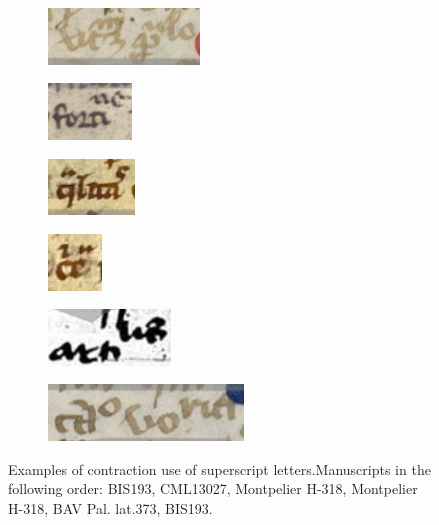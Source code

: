 \documentclass{article}
\begin{document}
\begin{figure}[H]
    \centering
    \begin{subfigure}{0.30\linewidth}
    \centering
    \includegraphics[height=1.5cm]{datapaper/images/examples/superscripts/BIS193_bis.png}
    \end{subfigure}
    \begin{subfigure}{0.30\linewidth}
    \centering
    \includegraphics[height=1.5cm]{datapaper/images/examples/superscripts/CML13027.png}
    \end{subfigure}
    \begin{subfigure}{0.30\linewidth}
    \centering
    \includegraphics[height=1.5cm]{datapaper/images/examples/superscripts/montpelier_H318.png}
    \end{subfigure}  
    \begin{subfigure}{0.20\linewidth}
    \centering
    \includegraphics[height=1.5cm]{datapaper/images/examples/superscripts/montpelier_H318_bis.png}
    \end{subfigure}
    \begin{subfigure}{0.30\linewidth}
    \centering
    \includegraphics[height=1.5cm]{datapaper/images/examples/superscripts/BAV_pallat_373.png}
    \end{subfigure}
     \begin{subfigure}{0.30\linewidth}
    \centering
    \includegraphics[height=1.5cm]{datapaper/images/examples/superscripts/BIS193.png}
    \end{subfigure}
    \caption{\label{tab:superscript} Examples of contraction use of superscript letters.Manuscripts in the following order: BIS193, CML13027, Montpelier H-318, Montpelier H-318, BAV Pal. lat.373, BIS193.}
\end{figure}
\end{document}
